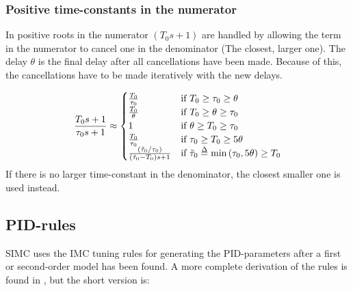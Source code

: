 \subsubsection{Positive time-constants in the numerator}
\label{sec:positive_numerator_time_constants}
In \cite{SIMC_source} positive roots in the numerator $\left( T_0 s +1 \right)$ are handled by allowing the term in the numerator to cancel one in the denominator (The closest, larger one). The delay $ \theta$ is the final delay after all cancellations have been made. Because of this, the cancellations have to be made iteratively with the new delays.

\begin{align}
    \frac{T_0 s +1}{\tau_0 s +1} \approx 
    \begin{cases}
        \frac{T_0}{\tau_0} & \text{if } T_0 \ge \tau_0 \ge \theta\\
        \frac{T_0}{\theta} & \text{if } T_0 \ge \theta \ge \tau_0\\
        1 & \text{if } \theta \ge T_0 \ge \tau_0\\
        \frac{T_0}{\tau_0} & \text{if } \tau_0 \ge T_0 \ge 5 \theta\\
        \frac{\left( \tilde{ \tau }_0 / \tau_0 \right)}{\left( \tilde{\tau}_0 - T_0  \right)s +1} & \text{if }  \tilde{\tau}_0 \delequal \text{min} \left( \tau_0, 5 \theta \right) \ge  T_0 
    \end{cases}
\end{align}
If there is no larger time-constant in the denominator, the closest smaller one is used instead. 

\subsection{PID-rules}
SIMC uses the IMC tuning rules for generating the PID-parameters after a first or second-order model has been found. A more complete derivation of the rules is found in \cite{SIMC_source}, but the short version is: 

